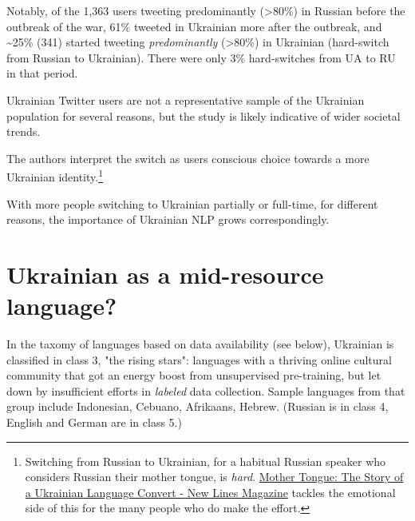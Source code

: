 Notably, of the 1,363 users tweeting predominantly (\textgreater80\%) in
Russian before the outbreak of the war, 61\% tweeted in Ukrainian more
after the outbreak, and \textasciitilde25\% (341) started tweeting
\emph{predominantly} (\textgreater80\%) in Ukrainian (hard-switch from
Russian to Ukrainian). There were only 3\% hard-switches from UA to RU
in that period.

Ukrainian Twitter users are not a representative sample of the Ukrainian
population for several reasons, but the study is likely indicative of
wider societal trends.

The authors interpret the switch as users\textquotesingle{} conscious
choice towards a more Ukrainian identity.\footnote{Switching from
  Russian to Ukrainian, for a habitual Russian speaker who considers Russian their mother tongue, is \emph{hard}.
  \href{https://newlinesmag.com/first-person/mother-tongue-the-story-of-a-ukrainian-language-convert/}{Mother
  Tongue: The Story of a Ukrainian Language Convert - New Lines
  Magazine}\cite{newlinesmagMotherTongue} tackles the emotional side of this for the many people who do make the effort.}


With more people switching to Ukrainian partially or full-time, for
different reasons, the importance of Ukrainian NLP grows
correspondingly.

\section{Ukrainian as a mid-resource
language?}\label{ukrainian-as-a-mid-resource-language}

In the taxomy of languages based on data availability \cite{inclusion}
(see below), Ukrainian is classified in class 3, "the rising stars":
languages with a thriving online cultural community that got an energy
boost from unsupervised pre-training, but let down by insufficient
efforts in \emph{labeled} data collection. Sample languages from that
group include Indonesian, Cebuano, Afrikaans, Hebrew. (Russian is in
class 4, English and German are in class 5.)


